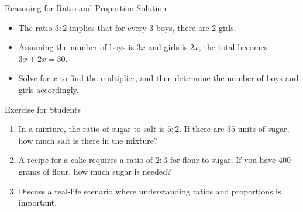 \begin{frame}{Reasoning for Ratio and Proportion Solution}
  \begin{itemize}
    \item The ratio $3:2$ implies that for every $3$ boys, there are $2$ girls.
    \item Assuming the number of boys is $3x$ and girls is $2x$, the total becomes $3x + 2x = 30$.
    \item Solve for $x$ to find the multiplier, and then determine the number of boys and girls accordingly.
  \end{itemize}
\end{frame}

\begin{frame}{Exercise for Students}
  \begin{enumerate}
    \item In a mixture, the ratio of sugar to salt is $5:2$. If there are $35$ units of sugar, how much salt is there in the mixture?
    \item A recipe for a cake requires a ratio of $2:3$ for flour to sugar. If you have $400$ grams of flour, how much sugar is needed?
    \item Discuss a real-life scenario where understanding ratios and proportions is important.
  \end{enumerate}
\end{frame}

